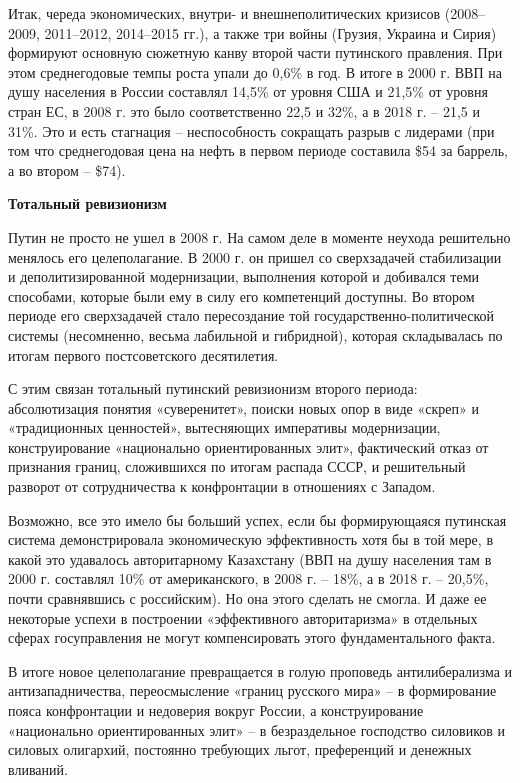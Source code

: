 Итак, череда экономических, внутри- и внешнеполитических кризисов (2008–2009, 2011–2012, 2014–2015 гг.), а также три войны (Грузия, Украина и Сирия) формируют основную сюжетную канву второй части путинского правления. При этом среднегодовые темпы роста упали до 0,6\% в год. В итоге в 2000 г. ВВП на душу населения в России составлял 14,5\% от уровня США и 21,5\% от уровня стран ЕС, в 2008 г. это было соответственно 22,5 и 32\%, а в 2018 г. – 21,5 и 31\%. Это и есть стагнация – неспособность сокращать разрыв с лидерами (при том что среднегодовая цена на нефть в первом периоде составила \$54 за баррель, а во втором – \$74).

\textbf{Тотальный ревизионизм}



Путин не просто не ушел в 2008 г. На самом деле в моменте неухода решительно менялось его целеполагание. В 2000 г. он пришел со сверхзадачей стабилизации и деполитизированной модернизации, выполнения которой и добивался теми способами, которые были ему в силу его компетенций доступны. Во втором периоде его сверхзадачей стало пересоздание той государственно-политической системы (несомненно, весьма лабильной и гибридной), которая складывалась по итогам первого постсоветского десятилетия.

С этим связан тотальный путинский ревизионизм второго периода: абсолютизация понятия «суверенитет», поиски новых опор в виде «скреп» и «традиционных ценностей», вытесняющих императивы модернизации, конструирование «национально ориентированных элит», фактический отказ от признания границ, сложившихся по итогам распада СССР, и решительный разворот от сотрудничества к конфронтации в отношениях с Западом.

Возможно, все это имело бы больший успех, если бы формирующаяся путинская система демонстрировала экономическую эффективность хотя бы в той мере, в какой это удавалось авторитарному Казахстану (ВВП на душу населения там в 2000 г. составлял 10\% от американского, в 2008 г. – 18\%, а в 2018 г. – 20,5\%, почти сравнявшись с российским). Но она этого сделать не смогла. И даже ее некоторые успехи в построении «эффективного авторитаризма» в отдельных сферах госуправления не могут компенсировать этого фундаментального факта.

В итоге новое целеполагание превращается в голую проповедь антилиберализма и антизападничества, переосмысление «границ русского мира» – в формирование пояса конфронтации и недоверия вокруг России, а конструирование «национально ориентированных элит» – в безраздельное господство силовиков и силовых олигархий, постоянно требующих льгот, преференций и денежных вливаний.

